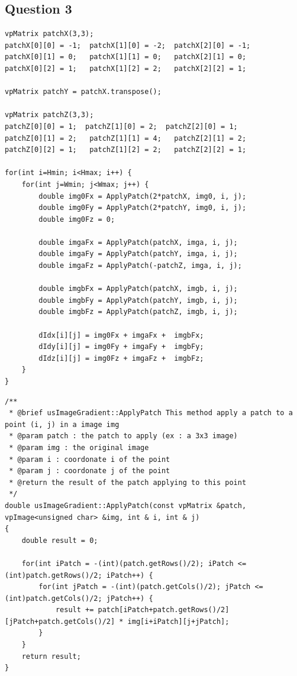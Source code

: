 \documentclass[a4paper,11pt]{article}
\begin{document}
\subsection{Question 3}
\begin{verbatim}
vpMatrix patchX(3,3);
patchX[0][0] = -1;  patchX[1][0] = -2;  patchX[2][0] = -1;
patchX[0][1] = 0;   patchX[1][1] = 0;   patchX[2][1] = 0;
patchX[0][2] = 1;   patchX[1][2] = 2;   patchX[2][2] = 1;

vpMatrix patchY = patchX.transpose();

vpMatrix patchZ(3,3);
patchZ[0][0] = 1;  patchZ[1][0] = 2;  patchZ[2][0] = 1;
patchZ[0][1] = 2;   patchZ[1][1] = 4;   patchZ[2][1] = 2;
patchZ[0][2] = 1;   patchZ[1][2] = 2;   patchZ[2][2] = 1;

for(int i=Hmin; i<Hmax; i++) {
	for(int j=Wmin; j<Wmax; j++) {
    	double img0Fx = ApplyPatch(2*patchX, img0, i, j);
    	double img0Fy = ApplyPatch(2*patchY, img0, i, j);
    	double img0Fz = 0;

    	double imgaFx = ApplyPatch(patchX, imga, i, j);
    	double imgaFy = ApplyPatch(patchY, imga, i, j);
    	double imgaFz = ApplyPatch(-patchZ, imga, i, j);
	
    	double imgbFx = ApplyPatch(patchX, imgb, i, j);
    	double imgbFy = ApplyPatch(patchY, imgb, i, j);
    	double imgbFz = ApplyPatch(patchZ, imgb, i, j);

        dIdx[i][j] = img0Fx + imgaFx +  imgbFx;
        dIdy[i][j] = img0Fy + imgaFy +  imgbFy;
        dIdz[i][j] = img0Fz + imgaFz +  imgbFz;
    }
}
\end{verbatim}


\begin{verbatim}
/**
 * @brief usImageGradient::ApplyPatch This method apply a patch to a point (i, j) in a image img
 * @param patch : the patch to apply (ex : a 3x3 image)
 * @param img : the original image
 * @param i : coordonate i of the point
 * @param j : coordonate j of the point
 * @return the result of the patch applying to this point
 */
double usImageGradient::ApplyPatch(const vpMatrix &patch, vpImage<unsigned char> &img, int & i, int & j)
{
    double result = 0;

    for(int iPatch = -(int)(patch.getRows()/2); iPatch <= (int)patch.getRows()/2; iPatch++) {
        for(int jPatch = -(int)(patch.getCols()/2); jPatch <= (int)patch.getCols()/2; jPatch++) {
            result += patch[iPatch+patch.getRows()/2][jPatch+patch.getCols()/2] * img[i+iPatch][j+jPatch];
        }
    }
    return result;
}
\end{verbatim}
\end{document}
